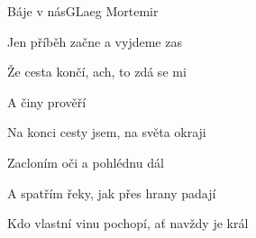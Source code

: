 \begin{song}{Báje v nás}{G}{Laeg Mortemir}
\begin{SBChorus*}
Jen příběh začne a vyjdeme zas

Že cesta končí, ach, to zdá se mi

A činy prověří 

\end{SBChorus*}

\begin{SBVerse}

Na konci cesty jsem, na světa okraji

Zacloním oči a pohlédnu dál

A spatřím řeky, jak přes hrany padají

Kdo vlastní vinu pochopí, ať navždy je král

\end{SBVerse}

\begin{SBChorus}

\end{SBChorus}

\end{song}

\clearpage

